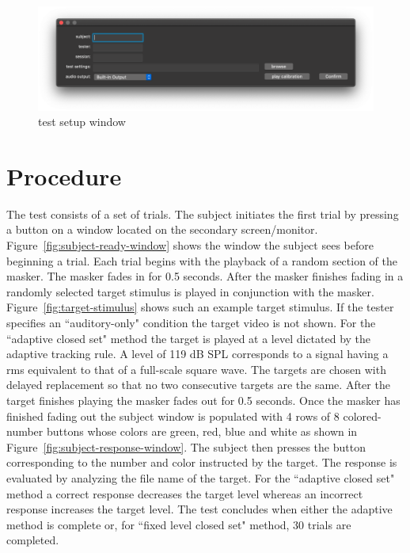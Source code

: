 \documentclass[11pt,pdftex,letterpaper]{article}
\begin{document}
\begin{figure}
\centering
\includegraphics[width = 0.9\linewidth]{test-setup-window.png}
\caption{test setup window}
\label{fig:test-setup-window}
\end{figure}

\noindent\begin{minipage}{\textwidth}

\end{minipage}


\section{Procedure}
The test consists of a set of trials. The subject initiates the first trial by pressing a button on a window located on the secondary screen/monitor. Figure~\ref{fig:subject-ready-window} shows the window the subject sees before beginning a trial. Each trial begins with the playback of a random section of the masker. The masker fades in for 0.5 seconds. After the masker finishes fading in a randomly selected target stimulus is played in conjunction with the masker. Figure~\ref{fig:target-stimulus} shows such an example target stimulus.
If the tester specifies an ``auditory-only" condition the target video is not shown. For the ``adaptive closed set" method the target is played at a level dictated by the adaptive tracking rule. A level of 119 dB SPL corresponds to a signal having a rms equivalent to that of a full-scale square wave. The targets are chosen with delayed replacement so that no two consecutive targets are the same. After the target finishes playing the masker fades out for 0.5 seconds. Once the masker has finished fading out the subject window is populated with 4 rows of 8 colored-number buttons whose colors are green, red, blue and white as shown in Figure~\ref{fig:subject-response-window}. The subject then presses the button corresponding to the number and color instructed by the target. The response is evaluated by analyzing the file name of the target. For the ``adaptive closed set" method a correct response decreases the target level whereas an incorrect response increases the target level. The test concludes when either the adaptive method is complete or, for ``fixed level closed set" method, 30 trials are completed.
\end{document}
